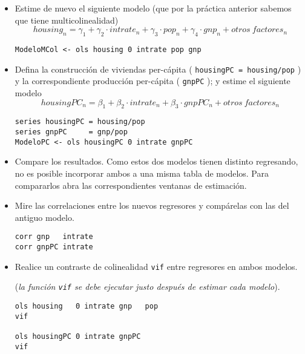 \documentclass[11pt]{article}
\begin{document}
\begin{itemize}
\item Estime de nuevo el siguiente modelo (que por la práctica anterior sabemos que tiene multicolinealidad)
\begin{displaymath}
  housing_{n} = \gamma_1 + \gamma_2\cdot intrate_n +  \gamma_3 \cdot pop_n +  \gamma_4 \cdot gnp_n + otros\ factores_n
\end{displaymath}
{\vspace{0pt} \color{gray!70!black}
\begin{verbatim}
ModeloMCol <- ols housing 0 intrate pop gnp
\end{verbatim}
}

\item Defina la construcción de viviendas per-cápita
( \texttt{housingPC = housing/pop} ) y la correspondiente producción
per-cápita ( \texttt{gnpPC} ); y estime el siguiente modelo
\begin{displaymath}
  housingPC_{n} = \beta_1 + \beta_2\cdot intrate_n +  \beta_3 \cdot gnpPC_n + otros\ factores_n
\end{displaymath}
{\vspace{0pt} \color{gray!70!black}
\begin{verbatim}
series housingPC = housing/pop
series gnpPC     = gnp/pop
ModeloPC <- ols housingPC 0 intrate gnpPC 
\end{verbatim}
}

\item Compare los resultados. Como estos dos modelos tienen distinto
regresando, no es posible incorporar ambos a una misma tabla de
modelos. Para compararlos abra las correspondientes ventanas de
estimación.

\item Mire las correlaciones entre los nuevos regresores y compárelas con las del antiguo modelo.
{\vspace{0pt} \color{gray!70!black}
\begin{verbatim}
corr gnp   intrate
corr gnpPC intrate
\end{verbatim}
}

\item Realice un contraste de colinealidad \texttt{vif} entre regresores en ambos modelos.

(\emph{la función \texttt{vif} se debe ejecutar justo después de estimar cada modelo}).
{\vspace{0pt} \color{gray!70!black}
\begin{verbatim}
ols housing   0 intrate gnp   pop
vif

ols housingPC 0 intrate gnpPC 
vif
\end{verbatim}
}
\end{itemize}
\end{document}
